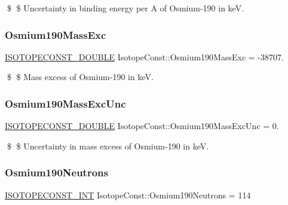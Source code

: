 \$ \$ Uncertainty in binding energy per A of Osmium-\/190 in keV. \mbox{\label{group___isotope_const-_osmium-_os190_gae9d1377aab7f14630fd712a83047f707}} 
\subsubsection{\texorpdfstring{Osmium190\+Mass\+Exc}{Osmium190MassExc}}
{\footnotesize\ttfamily \mbox{\hyperlink{group___isotope_const-_macros_ga8f45a7272ce02c0b4c65c44636ed719a}{I\+S\+O\+T\+O\+P\+E\+C\+O\+N\+S\+T\+\_\+\+D\+O\+U\+B\+LE}} Isotope\+Const\+::\+Osmium190\+Mass\+Exc = -\/38707.}

\$ \$ Mass excess of Osmium-\/190 in keV. \mbox{\label{group___isotope_const-_osmium-_os190_gad12e612a159b81adb4d4755afdc35309}} 
\subsubsection{\texorpdfstring{Osmium190\+Mass\+Exc\+Unc}{Osmium190MassExcUnc}}
{\footnotesize\ttfamily \mbox{\hyperlink{group___isotope_const-_macros_ga8f45a7272ce02c0b4c65c44636ed719a}{I\+S\+O\+T\+O\+P\+E\+C\+O\+N\+S\+T\+\_\+\+D\+O\+U\+B\+LE}} Isotope\+Const\+::\+Osmium190\+Mass\+Exc\+Unc = 0.}

\$ \$ Uncertainty in mass excess of Osmium-\/190 in keV. \mbox{\label{group___isotope_const-_osmium-_os190_ga5c15afc1a5f4ca18f7dbd282fd856284}} 
\subsubsection{\texorpdfstring{Osmium190\+Neutrons}{Osmium190Neutrons}}
{\footnotesize\ttfamily \mbox{\hyperlink{group___isotope_const-_macros_ga5f18360b3e99483a35c32d789e62621c}{I\+S\+O\+T\+O\+P\+E\+C\+O\+N\+S\+T\+\_\+\+I\+NT}} Isotope\+Const\+::\+Osmium190\+Neutrons = 114}

